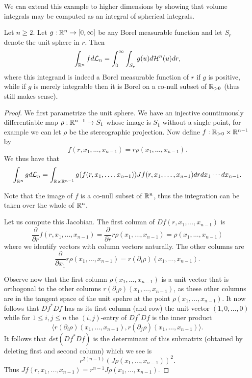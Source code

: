 \documentclass[twoside, a4paper, 10pt]{amsart}
\begin{document}
We can extend this example to higher dimensions by showing that volume integrals may be computed as an integral of spherical integrals.

\begin{prop} \label{prop: co-area spherical} Let $n \geq 2$. Let $g:\mathbb{R}^n \to [0,\infty]$ be any Borel measurable function and let $S_r$ denote the unit sphere in $r$. Then $$\int_{\mathbb{R}^n} f d\mathcal{L}_n = \int_{0}^{\infty} \int_{S_r} g(u) d\mathcal{H}^n(u) dr,$$ where this integrand is indeed a Borel measurable function of $r$ if $g$ is positive, while if $g$ is merely integrable then it is Borel on a co-null subset of $\mathbb{R}_{>0}$ (thus still makes sense).

\end{prop}

\begin{proof} We first parametrize the unit sphere. We have an injective countinuously differentiable map $\rho:\mathbb{R}^{n-1} \to S_1$ whose image is $S_1$ without a single point, for example we can let $\rho$ be the stereographic projection. Now define $f:\mathbb{R}_{>0} \times \mathbb{R}^{n-1}$ by $$f(r,x_1, \ldots, x_{n-1}) = r \rho(x_1, \ldots, x_{n-1}).$$ We thus have that $$\int_{\mathbb{R}^n} g d\mathcal{L}_n = \int_{\mathbb{R} \times \mathbb{R}^{n-1}} g(f(r, x_1, \ldots, x_{n-1})) Jf(r,x_1, \ldots, x_{n-1}) dr dx_1 \cdots dx_{n-1}.$$

Note that the image of $f$ is a co-null subset of $\mathbb{R}^n$, thus the integration can be taken over the whole of $\mathbb{R}^n$.

Let us compute this Jacobian. The first column of $Df(r,x_1, \ldots, x_{n-1})$ is $$\frac{\partial}{\partial r} f(r,x_1, \ldots, x_{n-1}) = \frac{\partial}{\partial r} r \rho(x_1, \ldots, x_{n-1}) = \rho(x_1, \ldots, x_{n-1})$$ where we identify vectors with column vectors naturally.
The other columns are $$\frac{\partial}{\partial x_1} r \rho(x_1, \ldots, x_{n-1}) = r (\partial_i \rho)(x_1, \ldots, x_{n-1}).$$

Observe now that the first column $\rho(x_1, \ldots, x_{n-1})$ is a unit vector that is orthogonal to the other columns $r (\partial_i \rho)(x_1, \ldots, x_{n-1})$, as these other columns are in the tangent space of the unit spehre at the point $\rho(x_1, \ldots, x_{n-1})$. It now follows that $Df^* Df$ has as its first column (and row) the unit vector $(1, 0, \ldots, 0)$ while for $1 \leq i, j \leq n$ the $(i,j)$-entry of $Df^* Df$ is the inner product $$\langle r (\partial_i \rho)(x_1, \ldots, x_{n-1}), r (\partial_j \rho)(x_1, \ldots, x_{n-1}) \rangle.$$ It follows that $det(Df^* Df)$ is the determinant of this submatrix (obtained by deleting first and second column) which we see is $$r^{2(n-1)} (J\rho(x_1, \ldots, x_{n-1}))^2.$$ Thus $Jf(r,x_1, \ldots, x_{n-1}) = r^{n-1} J\rho(x_1, \ldots, x_{n-1})$.


\end{proof}
\end{document}
